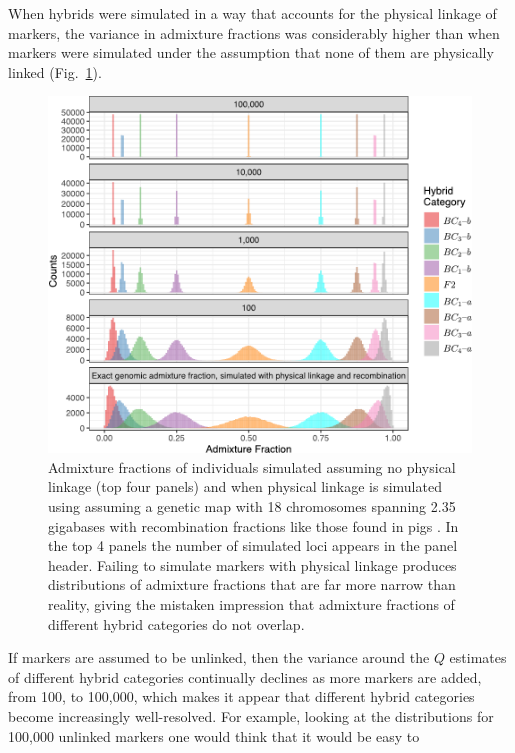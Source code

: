 {When hybrids were simulated in a way that accounts for the physical linkage of
markers, the variance in admixture fractions was considerably higher than when
markers were simulated under the assumption that none of them are physically
linked (Fig.~\ref{fig:ad-fract-sims}).
\begin{figure}
\newcommand{\adfcap}{\footnotesize Admixture fractions of individuals simulated
assuming no physical linkage (top four panels)
and when physical linkage is simulated using \gscramble{} assuming a genetic map with 18 chromosomes spanning 2.35 gigabases with recombination fractions like those found in pigs
\citep{tortereau2012high}.  In the top 4 panels the number
of simulated loci appears in the panel header.  Failing to simulate markers with physical linkage
produces distributions of admixture fractions that are far more narrow than reality, giving the
mistaken impression that admixture fractions of different hybrid categories do not overlap.  }
\includegraphics[width=\columnwidth]{figures/link-and-nolink-sims-crop.pdf}
\caption[\adfcap]{\adfcap}
\label{fig:ad-fract-sims}
\end{figure}
If markers are assumed to be unlinked, then the variance around the $Q$ estimates of different 
hybrid categories continually declines as more markers are added, from 100, to 100,000, which 
makes it appear that different hybrid categories become increasingly well-resolved.  For example, 
looking at the distributions for 100,000 unlinked markers one would think that it would be easy to 
}
